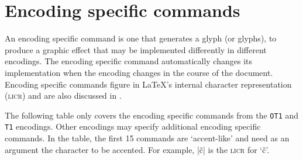 \documentclass{ltxguide}[1994/11/20]
\providecommand{\Enc}[1]{\texttt{#1}}
\begin{document}
\iffalse
\begin{center}\tiny
\mbox{\dolctable{0}{65}\vrule
\dolctable{65}{128}\vrule
\dolctable{128}{193}\vrule
\dolctable{193}{256}}
\end{center}
\fi



\section{Encoding specific commands}

An encoding specific command is one that generates a glyph (or
glyphs), to produce a graphic effect that may be implemented
differently in different encodings.  The encoding specific command
automatically changes its implementation when the encoding changes in
the course of the document.  Encoding specific commands figure in
\LaTeX's internal character representation (\textsc{licr}) and are also
discussed in \cite[sec.~7.11.2, p.442]{A-W:MG2004}.

The following table only covers the encoding specific commands from
the \Enc{OT1} and \Enc{T1} encodings. Other encodings may specify
additional encoding specific commands.  In the table, the first 15
commands are `accent-like' and need as an argument the character to be
accented.  For example, |\v{c}| is the \textsc{licr} for `\v{c}'.
\end{document}

